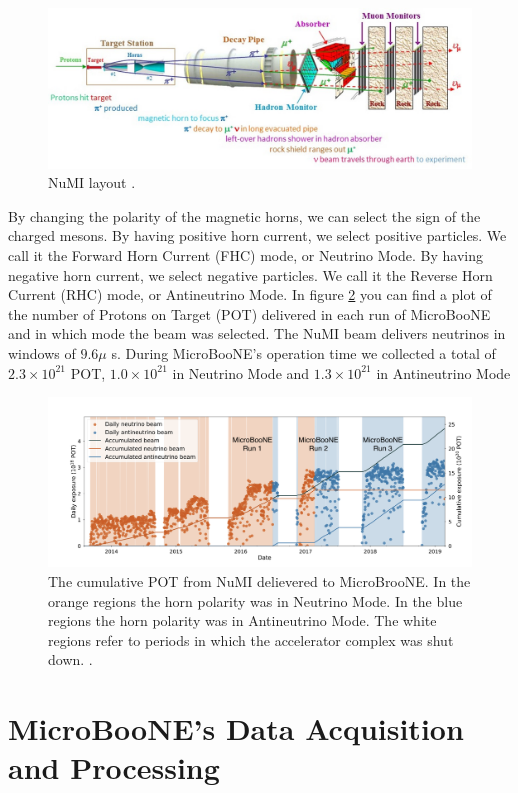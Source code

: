 \begin{figure}[h!]
    \centering
    \includegraphics[width=140mm]{Figures/numi.jpg}
    \caption{NuMI layout \cite{numi}.}
    \label{fig:numi}
\end{figure}

By changing the polarity of the magnetic horns, we can select the sign of the charged mesons. By having positive horn current, we select positive particles. We call it the Forward Horn Current (FHC) mode, or Neutrino Mode. By having negative horn current, we select negative particles. We call it the Reverse Horn Current (RHC) mode, or Antineutrino Mode. In figure \ref{beam_mode_uboone} you can find a plot of the number of Protons on Target (POT) delivered in each run of MicroBooNE and in which mode the beam was selected. The NuMI beam delivers neutrinos in windows of $9.6 \mu$ s. During MicroBooNE's operation time we collected a total of $2.3\times 10^{21}$ POT, $1.0\times10^{21}$ in Neutrino Mode and $1.3\times10^{21}$ in Antineutrino Mode

\begin{figure}[h!]
    \centering
    \includegraphics[width=150mm]{Figures/beam_mode_uboone.png}
    \caption{The cumulative POT from NuMI delievered to MicroBrooNE. In the orange regions the horn polarity was in Neutrino Mode. In the blue regions the horn polarity was in Antineutrino Mode. The white regions refer to periods in which the accelerator complex was shut down. \cite{krish_phd}.}
    \label{beam_mode_uboone}
\end{figure}

\section{MicroBooNE's Data Acquisition and Processing}